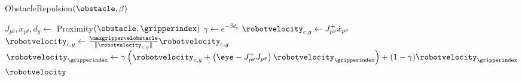 \begin{algorithm}[t]
    \caption{ObstacleRepulsion$(\obstacle, \beta)$}
    \begin{algorithmic}[1]
            \State $J_{p^g}, \dot x _{p^g}, d_g \gets$ Proximity$(\obstacle, \gripperindex)$
            \State $\gamma \gets e^{-\beta d_g}$
            \State $\robotvelocity_{c,g} \gets J_{p^g}^+ \dot x_{p^g}$
            \State $\robotvelocity_{c,g} \gets \frac{\maxgrippervelobstacle}{\| \robotvelocity_{c,g} \|} \robotvelocity_{c,g}$
            \State  $\robotvelocity_{\gripperindex} \gets \gamma \left( \robotvelocity_{c,g} + \left( \eye - J_{p^g}^+ J_{p^g} \right) \robotvelocity_\gripperindex \right) + (1-\gamma)\robotvelocity_\gripperindex$
        \EndFor        
        \State \Return $\robotvelocity$
    \end{algorithmic}
    \label{alg:obstaclerepulsion}
\end{algorithm}